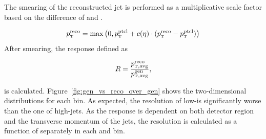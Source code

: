 The smearing of the reconstructed jet \pt is performed as a multiplicative scale
factor based on the difference of \ptreco and \ptgen.

\begin{equation}
\ptreco = \max \left( 0, \ptgen + c(\eta) \cdot (\ptreco - \ptgen) \right)
\end{equation}
%
After smearing, the response defined as

\begin{equation}
    R = \frac{\ptavg^{\text{reco}}}{\ptavg^{\text{gen}}},
\end{equation}

is calculated. Figure~\ref{fig:gen_vs_reco_over_gen} shows the two-dimensional
distributions for each bin. As expected, the resolution of low-\pt is
significantly worse than the one of high-\pt jets. As the response is dependent
on both detector region and the transverse momentum of the jets, the resolution
is calculated as a function of \ptavggen separately in each \ystar and \yboost
bin. 

